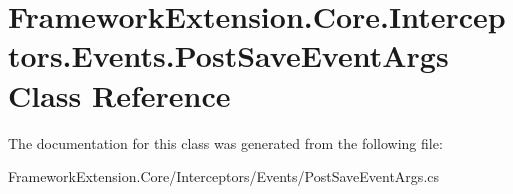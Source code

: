 \hypertarget{class_framework_extension_1_1_core_1_1_interceptors_1_1_events_1_1_post_save_event_args}{\section{Framework\-Extension.\-Core.\-Interceptors.\-Events.\-Post\-Save\-Event\-Args Class Reference}
\label{class_framework_extension_1_1_core_1_1_interceptors_1_1_events_1_1_post_save_event_args}
}


The documentation for this class was generated from the following file\-:\begin{DoxyCompactItemize}
\item 
Framework\-Extension.\-Core/\-Interceptors/\-Events/Post\-Save\-Event\-Args.\-cs\end{DoxyCompactItemize}
